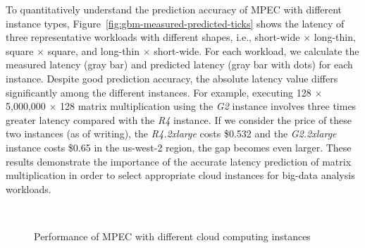 \documentclass[10pt, conference, compsocconf]{IEEEtran}
\begin{document}
To quantitatively understand the prediction accuracy of MPEC with different instance types, Figure~\ref{fig:gbm-measured-predicted-ticks} shows the latency of three representative workloads with different shapes, i.e., short-wide $\times$ long-thin, square $\times$ square, and long-thin $\times$ short-wide. For each workload, we calculate the measured latency (gray bar) and predicted latency (gray bar with dots) for each instance. Despite good prediction accuracy, the absolute latency value differs significantly among the different instances. For example, executing 128 $\times$ 5,000,000 $\times$ 128 matrix multiplication using the \textit{G2} instance involves three times greater latency compared with the \textit{R4} instance. If we consider the price of these two instances (as of writing), the \textit{R4.2xlarge} costs \$0.532 and the \textit{G2.2xlarge} instance costs \$0.65 in the us-west-2 region, the gap becomes even larger. These results demonstrate the importance of the accurate latency prediction of matrix multiplication in order to select appropriate cloud instances for big-data analysis workloads.

\begin{figure}[t]
	\centering
	\\
	 \hfil
	\caption{\label{fig:gbm-comparison}Performance of MPEC with different cloud computing instances}
\end{figure}
\end{document}
